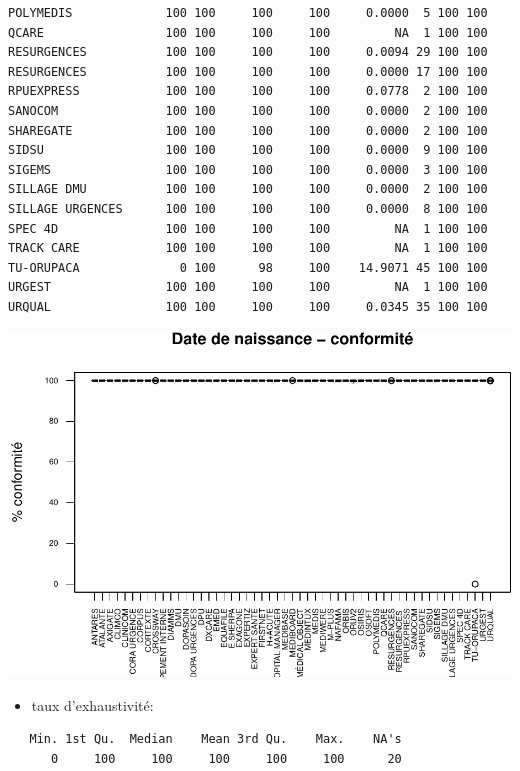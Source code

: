 \documentclass[]{article}
\begin{document}
\begin{verbatim}
POLYMEDIS             100 100     100     100     0.0000  5 100 100
QCARE                 100 100     100     100         NA  1 100 100
RESURGENCES           100 100     100     100     0.0094 29 100 100
RESURGENCES           100 100     100     100     0.0000 17 100 100
RPUEXPRESS            100 100     100     100     0.0778  2 100 100
SANOCOM               100 100     100     100     0.0000  2 100 100
SHAREGATE             100 100     100     100     0.0000  2 100 100
SIDSU                 100 100     100     100     0.0000  9 100 100
SIGEMS                100 100     100     100     0.0000  3 100 100
SILLAGE DMU           100 100     100     100     0.0000  2 100 100
SILLAGE URGENCES      100 100     100     100     0.0000  8 100 100
SPEC 4D               100 100     100     100         NA  1 100 100
TRACK CARE            100 100     100     100         NA  1 100 100
TU-ORUPACA              0 100      98     100    14.9071 45 100 100
URGEST                100 100     100     100         NA  1 100 100
URQUAL                100 100     100     100     0.0345 35 100 100
\end{verbatim}

\includegraphics{septembre2015_files/figure-latex/unnamed-chunk-18-1.pdf}

\begin{itemize}
\itemsep1pt\parskip0pt
\item
  taux d'exhaustivité:
\end{itemize}

\begin{verbatim}
   Min. 1st Qu.  Median    Mean 3rd Qu.    Max.    NA's 
      0     100     100     100     100     100      20 
\end{verbatim}
\end{document}
